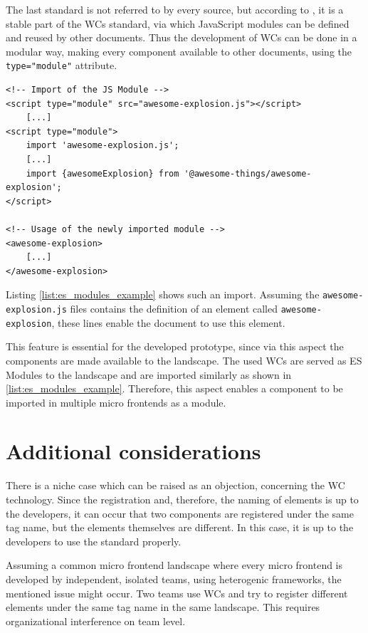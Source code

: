 The last standard is not referred to by every source, but according to \cite{wc_specifications}, it is a stable part of the WCs standard, via which JavaScript modules can be defined and reused by other documents.
Thus the development of WCs can be done in a modular way, making every component available to other documents, using the \texttt{type="module"} attribute.

\begin{lstlisting}[language=HTML5, caption=Importing modular Java Script documents into another \cite{wc_specifications}, label=list:es_modules_example,  xleftmargin=.0\textwidth, xrightmargin=.0\textwidth]
<!-- Import of the JS Module -->
<script type="module" src="awesome-explosion.js"></script>
	[...]
<script type="module">
	import 'awesome-explosion.js';
	[...]
	import {awesomeExplosion} from '@awesome-things/awesome-explosion';
</script>

<!-- Usage of the newly imported module -->
<awesome-explosion>
	[...]
</awesome-explosion>
\end{lstlisting}

Listing \ref{list:es_modules_example} shows such an import. Assuming the \texttt{awesome-explosion.js} files contains the definition of an element called \texttt{awesome-explosion}, these lines enable the document to use this element.\cite{wc_specifications}

This feature is essential for the developed prototype, since via this aspect the components are made available to the landscape. The used WCs are served as ES Modules to the landscape and are imported similarly as shown in \ref{list:es_modules_example}. Therefore, this aspect enables a component to be imported in multiple micro frontends as a module.

\section{Additional considerations}

There is a niche case which can be raised as an objection, concerning the WC technology. Since the registration and, therefore, the naming of elements is up to the developers, it can occur that two components are registered under the same tag name, but the elements themselves are different. In this case, it is up to the developers to use the standard properly.

Assuming a common micro frontend landscape where every micro frontend is developed by independent, isolated teams, using heterogenic frameworks, the mentioned issue might occur. Two teams use WCs and try to register different elements under the same tag name in the same landscape. This requires organizational interference on team level.

